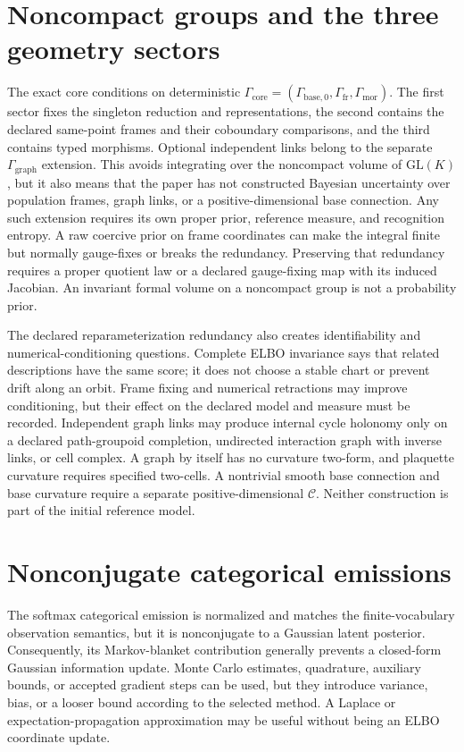\section{Noncompact groups and the three geometry sectors}

The exact core conditions on deterministic $\Gamma_{\mathrm{core}}=(\Gamma_{\mathrm{base},0},\Gamma_{\mathrm{fr}},\Gamma_{\mathrm{mor}})$. The first sector fixes the singleton reduction and representations, the second contains the declared same-point frames and their coboundary comparisons, and the third contains typed morphisms. Optional independent links belong to the separate $\Gamma_{\mathrm{graph}}$ extension. This avoids integrating over the noncompact volume of $\mathrm{GL}(K)$, but it also means that the paper has not constructed Bayesian uncertainty over population frames, graph links, or a positive-dimensional base connection. Any such extension requires its own proper prior, reference measure, and recognition entropy. A raw coercive prior on frame coordinates can make the integral finite but normally gauge-fixes or breaks the redundancy. Preserving that redundancy requires a proper quotient law or a declared gauge-fixing map with its induced Jacobian. An invariant formal volume on a noncompact group is not a probability prior.

The declared reparameterization redundancy also creates identifiability and numerical-conditioning questions. Complete ELBO invariance says that related descriptions have the same score; it does not choose a stable chart or prevent drift along an orbit. Frame fixing and numerical retractions may improve conditioning, but their effect on the declared model and measure must be recorded. Independent graph links may produce internal cycle holonomy only on a declared path-groupoid completion, undirected interaction graph with inverse links, or cell complex. A graph by itself has no curvature two-form, and plaquette curvature requires specified two-cells. A nontrivial smooth base connection and base curvature require a separate positive-dimensional $\mathcal C$. Neither construction is part of the initial reference model.

\section{Nonconjugate categorical emissions}

The softmax categorical emission is normalized and matches the finite-vocabulary observation semantics, but it is nonconjugate to a Gaussian latent posterior. Consequently, its Markov-blanket contribution generally prevents a closed-form Gaussian information update. Monte Carlo estimates, quadrature, auxiliary bounds, or accepted gradient steps can be used, but they introduce variance, bias, or a looser bound according to the selected method. A Laplace or expectation-propagation approximation may be useful without being an ELBO coordinate update.

